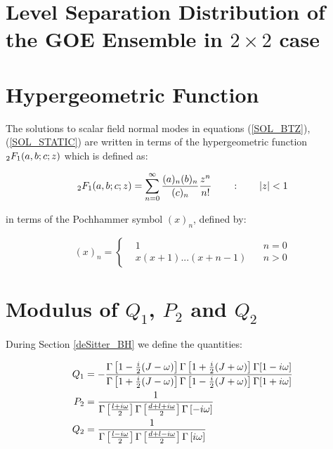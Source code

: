\documentclass[11pt,a4paper]{article}
\begin{document}
{\section{Level Separation Distribution of the GOE Ensemble in \texorpdfstring{$2\times 2$}{TEXT} case}

\section{Hypergeometric Function}

The solutions to scalar field normal modes in equations (\ref{SOL_BTZ}), (\ref{SOL_STATIC}) are written in terms of the hypergeometric function ${}_2F_1(a,b;c;z)$ which is defined as:

\begin{equation}
    {}_2F_1(a,b;c;z) = \sum^{\infty}_{n=0} \frac{(a)_n(b)_n}{(c)_n}\frac{z^n}{n!} ~~~~~~:~~~~~~ \left| z \right| < 1
\end{equation}

{\noindent in terms of the Pochhammer symbol $(x)_n$, defined by: }

\begin{equation}
    (x)_n=\left\{
        \begin{aligned}
            &1 &n=0 \\
            &x(x+1)...(x+n-1) ~~~~ &n>0
        \end{aligned}
        \right.
\end{equation}

\section{Modulus of \texorpdfstring{$Q_1$}{TEXT}, \texorpdfstring{$P_2$}{TEXT} and \texorpdfstring{$Q_2$}{TEXT}}

During Section \ref{deSitter_BH} we define the quantities:

\begin{equation}
    \begin{aligned}
        Q_1 &= - \frac{\Gamma\left[1-\frac{i}{2}(J-\omega)\right]\Gamma\left[1+\frac{i}{2}(J+\omega)\right]\Gamma[1-i\omega]}{\Gamma\left[1+\frac{i}{2}(J-\omega)\right]\Gamma\left[1-\frac{i}{2}(J+\omega)\right]\Gamma[1+i\omega]}\\
        P_2 &=\frac{1}{\Gamma\left[\frac{l+i\omega}{2}\right]\Gamma\left[\frac{d+l+i\omega}{2}\right]\Gamma\left[-i\omega\right]} \\
        Q_2 &=\frac{1}{\Gamma\left[\frac{l-i\omega}{2}\right]\Gamma\left[\frac{d+l-i\omega}{2}\right]\Gamma\left[i\omega\right]} 
    \end{aligned}
\end{equation}

}
\end{document}

